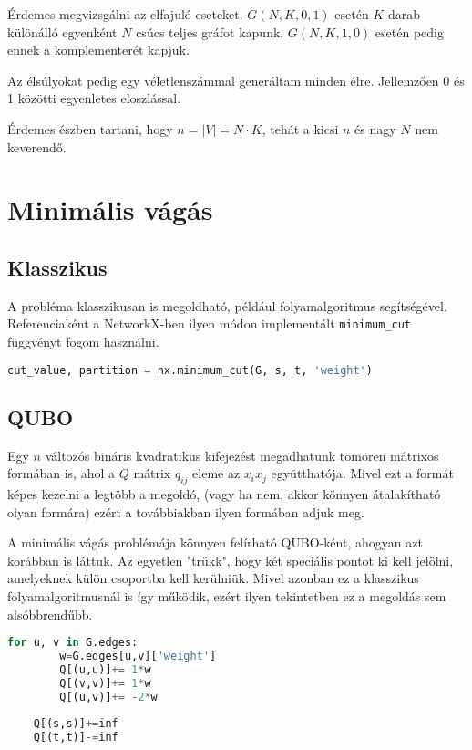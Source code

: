 Érdemes megvizsgálni az elfajuló eseteket. $G(N,K,0,1)$ esetén $K$ darab különálló egyenként $N$ csúcs teljes gráfot kapunk. $G(N,K,1,0)$ esetén pedig ennek a komplementerét kapjuk. 

Az élsúlyokat pedig egy véletlenszámmal generáltam minden élre. Jellemzően 0 és 1 közötti egyenletes eloszlással.

Érdemes észben tartani, hogy $n=|V|=N \cdot K$, tehát a kicsi $n$ és nagy $N$ nem keverendő.

\section{Minimális vágás}


\subsection{Klasszikus}

A probléma klasszikusan is megoldható, például folyamalgoritmus segítségével. Referenciaként a NetworkX-ben ilyen módon implementált \verb+minimum_cut+ függvényt fogom használni.

\begin{lstlisting}[language=Python,caption=Min-cut flow,label=code:minCutFlow]
	cut_value, partition = nx.minimum_cut(G, s, t, 'weight')
\end{lstlisting}


\subsection{QUBO}
Egy $n$ változós bináris kvadratikus kifejezést megadhatunk tömören mátrixos formában is, ahol a $Q$ mátrix $q_{ij}$ eleme az $x_i x_j$ együtthatója. Mivel ezt a formát képes kezelni a legtöbb a megoldó, (vagy ha nem, akkor könnyen átalakítható olyan formára) ezért a továbbiakban ilyen formában adjuk meg.

A minimális vágás problémája könnyen felírható QUBO-ként, ahogyan azt korábban is láttuk. Az egyetlen "trükk", hogy két speciális pontot ki kell jelölni, amelyeknek külön csoportba kell kerülniük. Mivel azonban ez a klasszikus folyamalgoritmusnál is így működik, ezért ilyen tekintetben ez a megoldás sem alsóbbrendűbb.

\begin{lstlisting}[language=python,caption=Min-cut QUBO,label=code:minCutQUBO]
	for u, v in G.edges:
		w=G.edges[u,v]['weight']
		Q[(u,u)]+= 1*w
		Q[(v,v)]+= 1*w
		Q[(u,v)]+= -2*w
	
	Q[(s,s)]+=inf
	Q[(t,t)]-=inf
\end{lstlisting}

